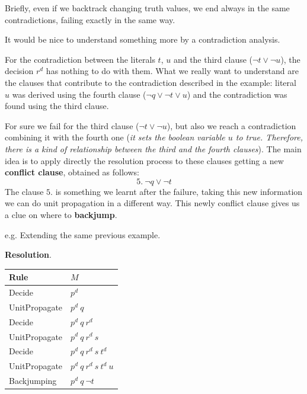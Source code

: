 \begin{example}
    Briefly, even if we backtrack changing truth values, we end always in the same contradictions, failing exactly in the same way. \vspace{7pt}

    It would be nice to understand something more by a contradiction analysis.
\end{example}
For the contradiction between the literals $t$, $u$ and the third clause ($\neg t \vee \neg u$), the decision $r^d$ has nothing to do with them. What we 
really want to understand are the clauses that contribute to the contradiction described in the example: literal $u$ was derived using the fourth clause 
($\neg q \vee \neg t \vee u$) and the contradiction was found using the third clause. \vspace{7pt}

For sure we fail for the third clause ($\neg t \vee \neg u$), but also we reach a contradiction combining it with the fourth one (\textit{it sets the boolean 
variable $u$ to true. Therefore, there is a kind of relationship between the third and the fourth clauses}). The main idea is to apply directly the resolution 
process to these clauses getting a new \textbf{conflict clause}, obtained as follows:
$$ 5. \ \neg q \vee \neg t $$
The clause $5.$ is something we learnt after the failure, taking this new information we can do unit propagation in a different way. This newly conflict clause 
gives us a clue on where to \textbf{backjump}.
\begin{example}
    e.g. Extending the same previous example. \vspace{7pt}

    \textbf{Resolution}. \vspace{7pt}
    \begin{center}
        \begin{tabular}{|p{2.75cm}|p{5cm}|}          
            \hline
                \textbf{Rule} & $M$\\ 
            \hline
                Decide & $p^d$ \\
            \hline
                UnitPropagate & $p^d \ q$ \\
            \hline
                Decide & $p^d \ q \ r^d$ \\
            \hline
                UnitPropagate & $p^d \ q \ r^d \ s$ \\
            \hline
                Decide & $p^d \ q \ r^d \ s \ t^d$  \\
            \hline
                UnitPropagate & $p^d \ q \ r^d \ s \ t^d \ u$  \\
            \hline
                Backjumping & $p^d \ q \ \neg t$ \\
            \hline
        \end{tabular}
    \end{center} \vspace{7pt}
\end{example}